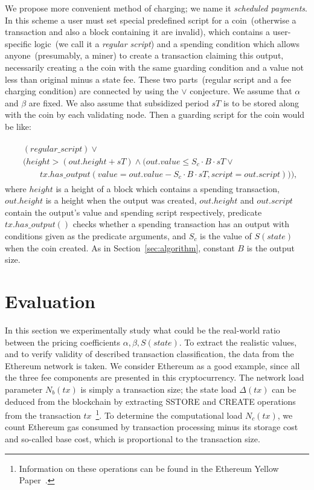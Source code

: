 \documentclass[]{llncs}   %
\begin{document}
We propose more convenient method of charging; we name it {\em scheduled payments}. In this scheme a user must set special predefined script for a coin~(otherwise a transaction and also a block containing it are invalid), which contains a user-specific logic~(we call it a {\em regular script}) and a spending condition which allows anyone~(presumably, a miner) to create a transaction claiming this output, necessarily creating a the coin with the same guarding condition and a value not less than original minus a state fee. These two parts~(regular script and a fee charging condition) are connected by using the $\lor$ conjecture. We assume that $\alpha$ and $\beta$ are fixed. We also assume that subsidized period $sT$ is to be stored along with the coin by each validating node. Then a guarding script for the coin would be like:

\begin{align}
\begin{split}
&(regular\_script) \lor \\
&(height > (out.height + sT) \land (out.value \le S_c \cdot B \cdot sT \lor \\  
&\qquad tx.has\_output(value = out.value - S_c \cdot B \cdot sT, script = out.script))),
\end{split}
\end{align}
where $height$ is a height of a block which contains a spending transaction, $out.height$ is a height when the output was created, $out.height$ and $out.script$ contain the output's value and spending script respectively, predicate $tx.has\_output()$ checks whether a spending transaction has an output with conditions given as the predicate arguments, and $S_c$ is the value of $S(state)$ when the coin created. As in Section~\ref{sec:algorithm}, constant $B$ is the output size.     


\section{Evaluation}
\label{sec:evaluation}

In this section we experimentally study what could be the real-world
ratio between the pricing coefficients $\alpha, \beta, S(state)$. To extract the realistic 
values, and to verify validity of described transaction classification, the
data from the Ethereum network is taken. We consider Ethereum as a good example,
since all the three fee components are presented in this cryptocurrency. The network load parameter $N_b(tx)$ is simply a transaction size; the state
load $\Delta(tx)$ can be deduced from the blockchain by extracting SSTORE
and CREATE operations from the transaction $tx$~\footnote{Information on these operations can be found in the Ethereum Yellow Paper~\cite{ethyp}.}. To determine the
computational load $N_c(tx)$, we count Ethereum gas consumed by transaction processing minus its storage cost and so-called base cost, which is proportional to the transaction size.
\end{document}

